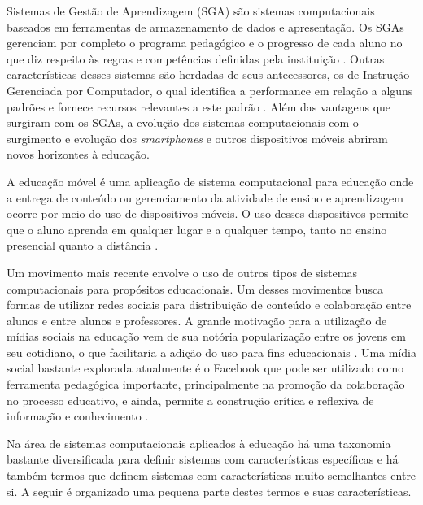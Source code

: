 Sistemas de Gestão de Aprendizagem (SGA) são sistemas computacionais baseados em ferramentas de armazenamento de dados e apresentação. Os SGAs gerenciam por completo o programa pedagógico e o progresso de cada aluno no que diz respeito às regras e competências definidas pela instituição \cite{flescher02}. Outras características desses sistemas são herdadas de seus antecessores, os de Instrução Gerenciada por Computador, o qual identifica a performance em relação a alguns padrões e fornece recursos relevantes a este padrão \cite{flescher02}. Além das vantagens que surgiram com os SGAs, a evolução dos sistemas computacionais com o surgimento e evolução dos \emph{smartphones} e outros dispositivos móveis abriram novos horizontes à educação.


A educação móvel é uma aplicação de sistema computacional para educação onde a entrega de conteúdo ou gerenciamento da atividade de ensino e aprendizagem ocorre por meio do uso de dispositivos móveis. O uso desses dispositivos permite que o aluno aprenda em qualquer lugar e a qualquer tempo, tanto no ensino presencial quanto a distância \cite{mlearning09}.

Um movimento mais recente envolve o uso de outros tipos de sistemas computacionais para propósitos educacionais. Um desses movimentos busca formas de utilizar redes sociais para distribuição de conteúdo e colaboração entre alunos e entre alunos e professores. A grande motivação para a utilização de mídias sociais na educação vem de sua notória popularização entre os jovens em seu cotidiano, o que facilitaria a adição do uso para fins educacionais \cite{dotta_uso_2011}. Uma mídia social bastante explorada atualmente é o Facebook que pode ser utilizado como ferramenta pedagógica importante, principalmente na promoção da colaboração no processo educativo, e ainda, permite a construção crítica e reflexiva de informação e conhecimento \cite{facebook11}.


Na área de sistemas computacionais aplicados à educação há uma taxonomia bastante diversificada para definir sistemas com características específicas e há também termos que definem sistemas com características muito semelhantes entre si. A seguir é organizado uma pequena parte destes termos e suas características.

